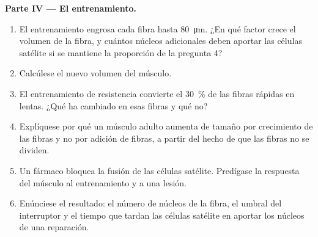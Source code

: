 \begin{problem}
\medskip
\noindent\textbf{Parte IV --- El entrenamiento.}
\begin{enumerate}[resume]
  \item El entrenamiento engrosa cada fibra hasta \qty{80}{\micro m}. ¿En
        qué factor crece el volumen de la fibra, y cuántos núcleos
        adicionales deben aportar las células satélite si se mantiene la
        proporción de la pregunta 4?
  \item Calcúlese el nuevo volumen del músculo.
  \item El entrenamiento de resistencia convierte el \qty{30}{\%} de las
        fibras rápidas en lentas. ¿Qué ha cambiado en esas fibras y qué no?
  \item Explíquese por qué un músculo adulto aumenta de tamaño por
        crecimiento de las fibras y no por adición de fibras, a partir del
        hecho de que las fibras no se dividen.
  \item Un fármaco bloquea la fusión de las células satélite. Predígase la
        respuesta del músculo al entrenamiento y a una lesión.
  \item Enúnciese el resultado: el número de núcleos de la fibra, el umbral
        del interruptor y el tiempo que tardan las células satélite en
        aportar los núcleos de una reparación.
\end{enumerate}
\end{problem}
